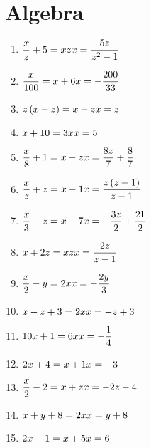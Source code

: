 \documentclass[fleqn]{exam}
\begin{document}
\section{Algebra}

\begin{multicols}{2}
\begin{enumerate}[label=(\alph*)]
\item $ \displaystyle \frac{x}{z} + 5 = x z\\x = \frac{5 z}{z^{2} - 1}$
\item $ \displaystyle \frac{x}{100} = x + 6\\x = - \frac{200}{33}$
\item $ \displaystyle z \left(x - z\right) = x - z\\x = z$
\item $ \displaystyle x + 10 = 3 x\\x = 5$
\item $ \displaystyle \frac{x}{8} + 1 = x - z\\x = \frac{8 z}{7} + \frac{8}{7}$
\item $ \displaystyle \frac{x}{z} + z = x - 1\\x = \frac{z \left(z + 1\right)}{z - 1}$
\item $ \displaystyle \frac{x}{3} - z = x - 7\\x = - \frac{3 z}{2} + \frac{21}{2}$
\item $ \displaystyle x + 2 z = x z\\x = \frac{2 z}{z - 1}$
\item $ \displaystyle \frac{x}{2} - y = 2 x\\x = - \frac{2 y}{3}$
\item $ \displaystyle x - z + 3 = 2 x\\x = - z + 3$
\item $ \displaystyle 10 x + 1 = 6 x\\x = - \frac{1}{4}$
\item $ \displaystyle 2 x + 4 = x + 1\\x = -3$
\item $ \displaystyle \frac{x}{2} - 2 = x + z\\x = - 2 z - 4$
\item $ \displaystyle x + y + 8 = 2 x\\x = y + 8$
\item $ \displaystyle 2 x - 1 = x + 5\\x = 6$

\end{enumerate}
\end{multicols}
\end{document}
